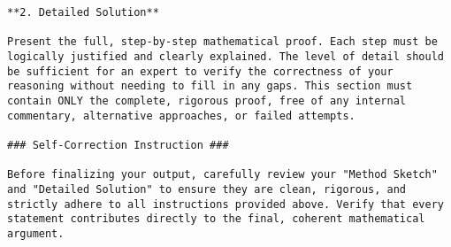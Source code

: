 \begin{lstlisting}
**2. Detailed Solution**

Present the full, step-by-step mathematical proof. Each step must be logically justified and clearly explained. The level of detail should be sufficient for an expert to verify the correctness of your reasoning without needing to fill in any gaps. This section must contain ONLY the complete, rigorous proof, free of any internal commentary, alternative approaches, or failed attempts.

### Self-Correction Instruction ###

Before finalizing your output, carefully review your "Method Sketch" and "Detailed Solution" to ensure they are clean, rigorous, and strictly adhere to all instructions provided above. Verify that every statement contributes directly to the final, coherent mathematical argument.
\end{lstlisting}

